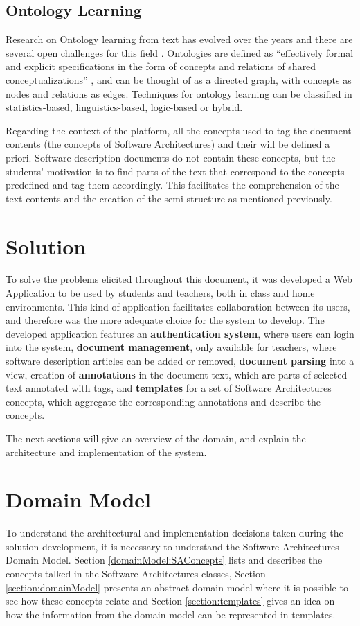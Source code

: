 \documentclass{llncs}
\begin{document}
\subsection{Ontology Learning}
Research on Ontology learning from text has evolved over the years and there are several open challenges for this field \cite{wong2012ontology}. Ontologies are defined as ``effectively formal and explicit specifications in the form of concepts and relations of shared conceptualizations'' \cite{gruber1993translation}, and can be thought of as a directed graph, with concepts as nodes and relations as edges. Techniques for ontology learning can be classified in statistics-based, linguistics-based, logic-based or hybrid.

Regarding the context of the platform, all the concepts used to tag the document contents (the concepts of Software Architectures) and their will be defined a priori. Software description documents do not contain these concepts, but the students' motivation is to find parts of the text that correspond to the concepts predefined and tag them accordingly. This facilitates the comprehension of the text contents and the creation of the semi-structure as mentioned previously.

\section{Solution}
\label{solution}
To solve the problems elicited throughout this document, it was developed a Web Application to be used by students and teachers, both in class and home environments. This kind of application facilitates collaboration between its users, and therefore was the more adequate choice for the system to develop. The developed application features an \textbf{authentication system}, where users can login into the system, \textbf{document management}, only available for teachers, where software description articles can be added or removed, \textbf{document parsing } into a view, creation of \textbf{annotations} in the document text, which are parts of selected text annotated with tags, and \textbf{templates }for a set of Software Architectures concepts, which aggregate the corresponding annotations and describe the concepts.

The next sections will give an overview of the domain, and explain the architecture and implementation of the system.
\section{Domain Model}
\label{domainModel}
To understand the architectural and implementation decisions taken during the solution development, it is necessary to understand the Software Architectures Domain Model. Section \ref{domainModel:SAConcepts} lists and describes the concepts talked in the Software Architectures classes, Section \ref{section:domainModel} presents an abstract domain model where it is possible to see how these concepts relate and Section \ref{section:templates} gives an idea on how the information from the domain model can be represented in templates.
\end{document}
